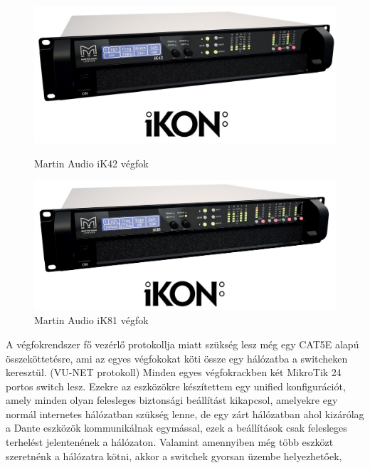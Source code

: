 \begin{figure}[H]
    \centering
    \begin{minipage}{0.45\textwidth}
        \centering
        \includegraphics[width=\linewidth, keepaspectratio]{figures/ikon_ik42.jpg}
        \caption{Martin Audio iK42 végfok}\label{fig:ikon_ik42}
    \end{minipage}\hfill
    \begin{minipage}{0.45\textwidth}
        \centering
        \includegraphics[width=\linewidth, keepaspectratio]{figures/ikon_ik81.jpg}
        \caption{Martin Audio iK81 végfok}\label{fig:ikon_ik81}
    \end{minipage}
\end{figure}
A végfokrendszer fő vezérlő protokollja miatt szükség lesz még egy CAT5E alapú
összeköttetésre, ami az egyes végfokokat köti össze egy hálózatba a switcheken keresztül. (VU-NET protokoll)
Minden egyes végfokrackben két MikroTik 24 portos switch lesz. 
Ezekre az eszközökre készítettem egy unified konfigurációt, amely minden olyan felesleges biztonsági
beállítást kikapcsol, amelyekre egy normál internetes hálózatban szükség lenne, de egy zárt hálózatban ahol kizárólag
a Dante eszközök kommunikálnak egymással, ezek a beállítások csak felesleges terhelést jelentenének a hálózaton.
Valamint amennyiben még több eszközt szeretnénk a hálózatra kötni, akkor a switchek gyorsan üzembe helyezhetőek,
